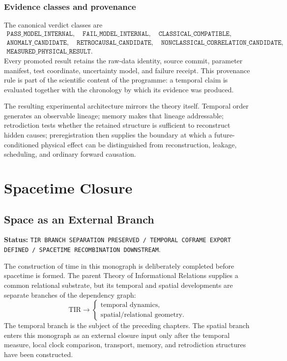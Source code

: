 \documentclass[11pt]{book}
\begin{document}
\section{Evidence classes and provenance}

The canonical verdict classes are
\[
\begin{gathered}
\texttt{PASS\_MODEL\_INTERNAL},\quad
\texttt{FAIL\_MODEL\_INTERNAL},\quad
\texttt{CLASSICAL\_COMPATIBLE},\\
\texttt{ANOMALY\_CANDIDATE},\quad
\texttt{RETROCAUSAL\_CANDIDATE},\quad
\texttt{NONCLASSICAL\_CORRELATION\_CANDIDATE},\\
\texttt{MEASURED\_PHYSICAL\_RESULT}.
\end{gathered}
\]
Every promoted result retains the raw-data identity, source commit, parameter manifest, test coordinate, uncertainty model, and failure receipt. This provenance rule is part of the scientific content of the programme: a temporal claim is evaluated together with the chronology by which its evidence was produced.

The resulting experimental architecture mirrors the theory itself. Temporal order generates an observable lineage; memory makes that lineage addressable; retrodiction tests whether the retained structure is sufficient to reconstruct hidden causes; preregistration then supplies the boundary at which a future-conditioned physical effect can be distinguished from reconstruction, leakage, scheduling, and ordinary forward causation.

\part{Spacetime Closure}
\chapter{Space as an External Branch}

\noindent\textbf{Status:} \texttt{TIR BRANCH SEPARATION PRESERVED / TEMPORAL COFRAME EXPORT DEFINED / SPACETIME RECOMBINATION DOWNSTREAM}.

The construction of time in this monograph is deliberately completed before spacetime is formed. The parent Theory of Informational Relations supplies a common relational substrate, but its temporal and spatial developments are separate branches of the dependency graph:
\[
\boxed{
\mathrm{TIR}
\longrightarrow
\begin{cases}
\text{temporal dynamics},\\
\text{spatial/relational geometry}.
\end{cases}}
\]
The temporal branch is the subject of the preceding chapters. The spatial branch enters this monograph as an external closure input only after the temporal measure, local clock comparison, transport, memory, and retrodiction structures have been constructed.
\end{document}

